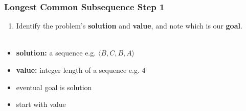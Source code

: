 \documentclass{beamer}
\newcommand{\stanza}{ \\~\ }
\begin{document}
  \begin{frame} \frametitle{Longest Common Subsequence Step 1}
    \begin{enumerate}
      \item Identify the problem's \textbf{solution} and \textbf{value}, and note which is our \textbf{goal}.
      \stanza
    \end{enumerate}

    \begin{itemize}
      \item \textbf{solution:} a sequence e.g. $\langle B, C, B, A \rangle$
      \item \textbf{value:} integer length of a sequence e.g. 4
      \item eventual goal is solution
      \item start with value
    \end{itemize}
  \end{frame}
  
\end{document}

